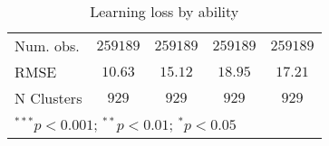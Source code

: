 \begin{table}
\begin{center}
\begin{tabular}{l c c c c}
Num. obs.                    & $259189$      & $259189$      & $259189$      & $259189$      \\
RMSE                         & $10.63$       & $15.12$       & $18.95$       & $17.21$       \\
N Clusters                   & $929$         & $929$         & $929$         & $929$         \\
\hline
\multicolumn{5}{l}{\scriptsize{$^{***}p<0.001$; $^{**}p<0.01$; $^{*}p<0.05$}}
\end{tabular}
\caption{Learning loss by ability}
\label{tableability}
\end{center}
\end{table}
